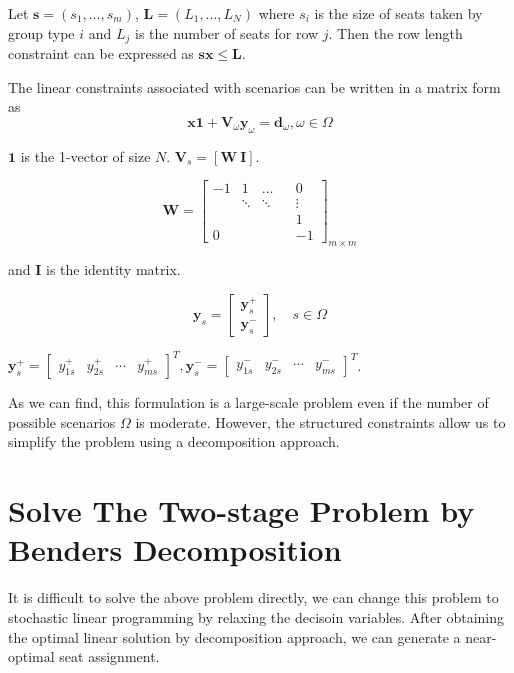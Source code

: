 
Let $\mathbf{s} = (s_1, \ldots, s_m)$, $\mathbf{L} = (L_1, \ldots, L_N)$ where $s_i$ is the size of seats taken by group type $i$ and $L_j$ is the number of seats for row $j$. Then the row length constraint can be expressed as $\mathbf{s} \mathbf{x} \leq \mathbf{L}$.

The linear constraints associated with scenarios can be written in a matrix form as
\[\mathbf{x} \mathbf{1} + \mathbf{V}_\omega \mathbf{y}_\omega = \mathbf{d}_\omega, \omega\in \Omega\]

$\mathbf{1}$ is the 1-vector of size $N$. $\mathbf{V}_s = [\mathbf{W} ~ \mathbf{I}]$.  

$$
\mathbf{W}=\left[\begin{array}{ccccc}
-1 & 1 & \ldots & & 0 \\
& \ddots & \ddots & & \vdots \\
& & & & 1 \\
0 & & & & -1
\end{array}\right]_{m \times m}
$$

and $\mathbf{I}$ is the identity matrix.

$$
\mathbf{y}_{s}=\left[\begin{array}{l}
\mathbf{y}_{s}^{+} \\
\mathbf{y}_{s}^{-}
\end{array}\right], \quad s \in \Omega
$$

$\mathbf{y}_{s}^{+}=\left[\begin{array}{lllll}y_{1 s}^{+} & y_{2 s}^{+} & \cdots & y_{m s}^{+}\end{array}\right]^{T}, \mathbf{y}_{s}^{-}=\left[\begin{array}{llll}y_{1 s}^{-} & y_{2 s}^{-} & \cdots & y_{m s}^{-}\end{array}\right]^{T}$.

As we can find, this formulation is a large-scale problem even if the number of possible scenarios $\Omega$ is moderate. However, the structured constraints allow us to simplify the problem using a decomposition approach.


\section{Solve The Two-stage Problem by Benders Decomposition}
It is difficult to solve the above problem directly, we can change this problem to stochastic linear programming by relaxing the decisoin variables. After obtaining the optimal linear solution by decomposition approach, we can generate a near-optimal seat assignment.


